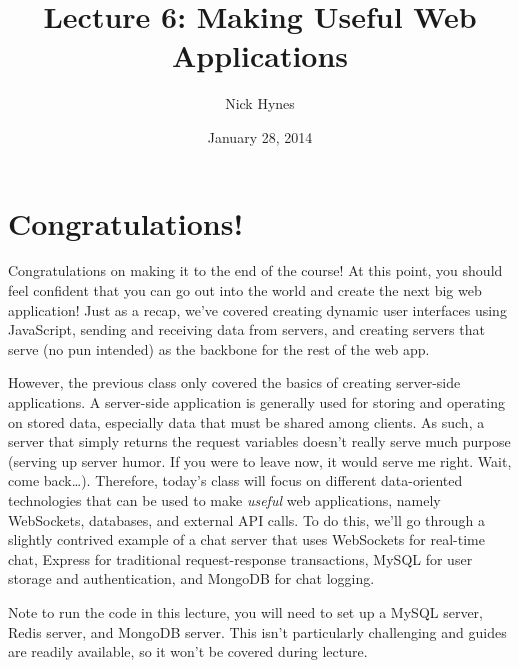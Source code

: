 \documentclass[12pt]{article}
\begin{document}
\title{Lecture 6: Making Useful Web Applications}
\author{Nick Hynes}
\date{January 28, 2014}

\maketitle

\begin{spacing}{0}
\setcounter{tocdepth}{1}
\tableofcontents
\end{spacing}

\section{Congratulations!}
Congratulations on making it to the end of the course! At this point, you should feel confident that you can go out into the world and create the next big web application! Just as a recap, we've covered creating dynamic user interfaces using JavaScript, sending and receiving data from servers, and creating servers that serve (no pun intended) as the backbone for the rest of the web app.
\par
However, the previous class only covered the basics of creating server-side applications. A server-side application is generally used for storing and operating on stored data, especially data that must be shared among clients. As such, a server that simply returns the request variables doesn't really serve much purpose (serving up server humor. If you were to leave now, it would serve me right. Wait, come back\ldots). Therefore, today's class will focus on different data-oriented technologies that can be used to make \emph{useful} web applications, namely WebSockets, databases, and external API calls. To do this, we'll go through a slightly contrived example of a chat server that uses WebSockets for real-time chat, Express for traditional request-response transactions, MySQL for user storage and authentication, and MongoDB for chat logging.
\par
Note to run the code in this lecture, you will need to set up a MySQL server, Redis server, and MongoDB server. This isn't particularly challenging and guides are readily available, so it won't be covered during lecture.
\end{document}
